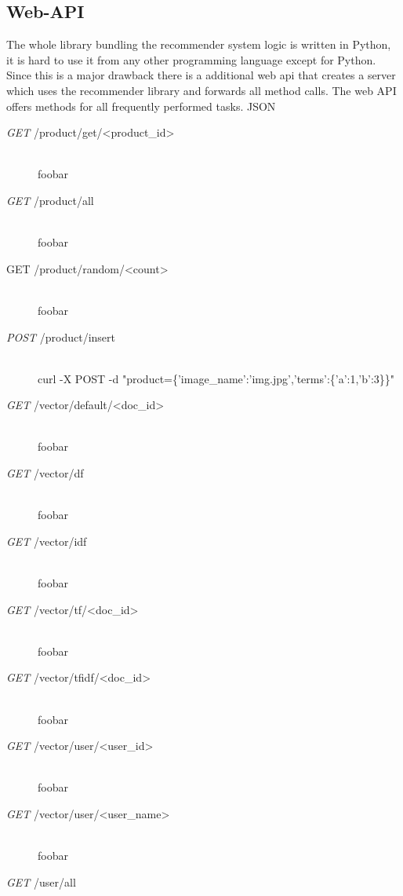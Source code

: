 

\subsection{Web-API}
The whole library bundling the recommender system logic is written in Python, it is hard to use it from any other programming language except for Python.
Since this is a major drawback there is a additional \gls{web api} that creates a server which uses the recommender library and forwards all method calls.
The web API offers methods for all frequently performed tasks.
{\color{red}JSON}

\begin{description}
    \item[\textit{GET} /product/get/\textless product\_id\textgreater]\hfill\\
        foobar
    \item[\textit{GET} /product/all]\hfill\\
        foobar
    \item[GET /product/random/\textless count\textgreater]\hfill\\
        foobar
    \item[\textit{POST} /product/insert]\hfill\\
        curl -X POST -d "product=\{'image\_name':'img.jpg','terms':\{'a':1,'b':3\}\}"
    \item[\textit{GET} /vector/default/\textless doc\_id\textgreater]\hfill\\
        foobar
    \item[\textit{GET} /vector/df]\hfill\\
        foobar
    \item[\textit{GET} /vector/idf]\hfill\\
        foobar
    \item[\textit{GET} /vector/tf/\textless doc\_id\textgreater]\hfill\\
        foobar
    \item[\textit{GET} /vector/tfidf/\textless doc\_id\textgreater]\hfill\\
        foobar
    \item[\textit{GET} /vector/user/\textless user\_id\textgreater]\hfill\\
        foobar
    \item[\textit{GET} /vector/user/\textless user\_name\textgreater]\hfill\\
        foobar
    \item[\textit{GET} /user/all]\hfill\\

\end{description}
